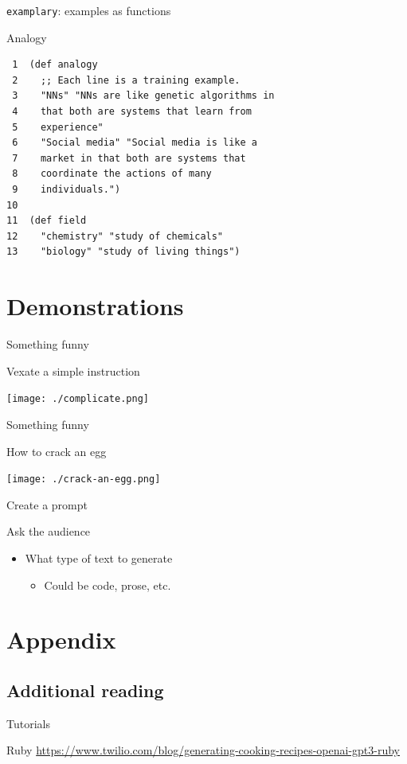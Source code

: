 \documentclass[presentation]{beamer}
\begin{document}
\begin{frame}[label={sec:org31feab3},fragile]{\texttt{examplary}: examples as functions}
 \begin{block}{Analogy}
{\footnotesize
\begin{verbatim}
 1  (def analogy
 2    ;; Each line is a training example.
 3    "NNs" "NNs are like genetic algorithms in
 4    that both are systems that learn from
 5    experience"
 6    "Social media" "Social media is like a
 7    market in that both are systems that
 8    coordinate the actions of many
 9    individuals.")
10  
11  (def field
12    "chemistry" "study of chemicals"
13    "biology" "study of living things")
\end{verbatim}
}
\end{block}
\end{frame}

\section{Demonstrations}
\label{sec:org192d4e1}
\begin{frame}[label={sec:org676f24e}]{Something funny}
\begin{block}{Vexate a simple instruction}
\begin{center}
\texttt{[image: ./complicate.png]}
\end{center}
\end{block}
\end{frame}

\begin{frame}[label={sec:org1b1b996}]{Something funny}
\begin{block}{How to crack an egg}
\begin{center}
\texttt{[image: ./crack-an-egg.png]}
\end{center}
\end{block}
\end{frame}

\begin{frame}[label={sec:orgeeef585}]{Create a prompt}
\begin{block}{Ask the audience}
\begin{itemize}
\item What type of text to generate
\begin{itemize}
\item Could be code, prose, etc.
\end{itemize}
\end{itemize}
\end{block}
\end{frame}

\section{Appendix}
\label{sec:org9149015}
\subsection{Additional reading}
\label{sec:orgfd9efef}
\begin{frame}[label={sec:orgd0b63c5}]{Tutorials}
\begin{block}{Ruby}
{\footnotesize
\url{https://www.twilio.com/blog/generating-cooking-recipes-openai-gpt3-ruby}
}
\end{block}
\end{frame}
\end{document}
